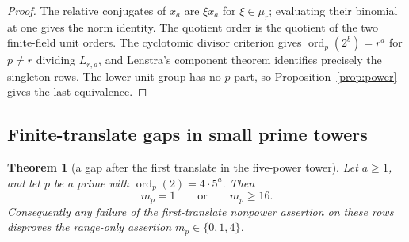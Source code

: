 \documentclass[11pt]{article}
\newtheorem{theorem}{Theorem}[section]
\theoremstyle{definition}
\theoremstyle{remark}
\begin{document}
\begin{proof}
The relative conjugates of $x_a$ are $\xi x_a$ for $\xi\in\mu_r$;
evaluating their binomial at one gives the norm identity.  The quotient order
is the quotient of the two finite-field unit orders.  The cyclotomic divisor
criterion gives $\operatorname{ord}_p(2^b)=r^a$ for $p\ne r$ dividing
$L_{r,a}$, and Lenstra's component theorem identifies precisely the
singleton rows.  The lower unit group has no $p$-part, so
Proposition~\ref{prop:power} gives the last equivalence.
\end{proof}

\subsection{Finite-translate gaps in small prime towers}

\begin{theorem}[a gap after the first translate in the five-power tower]
\label{thm:five-tower-gap}
Let $a\geq1$, and let $p$ be a prime with
$\operatorname{ord}_p(2)=4\cdot5^a$.  Then
\[
 m_p=1\qquad\text{or}\qquad m_p\geq16.
\]
Consequently any failure of the first-translate nonpower assertion on these
rows disproves the range-only assertion $m_p\in\{0,1,4\}$.
\end{theorem}
\end{document}
